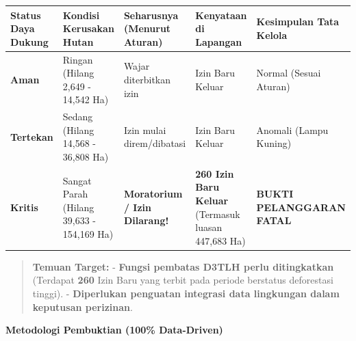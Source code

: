 \documentclass[
]{article}
\newcounter{none} %
\begin{document}
{\def\LTcaptype{none} %
\begin{longtable}[]{@{}
  >{\raggedright\arraybackslash}p{}
  >{\raggedright\arraybackslash}p{}
  >{\raggedright\arraybackslash}p{}
  >{\raggedright\arraybackslash}p{}
  >{\raggedright\arraybackslash}p{}@{}}
\toprule\noalign{}
\begin{minipage}[b]{\linewidth}\raggedright
Status Daya Dukung
\end{minipage} & \begin{minipage}[b]{\linewidth}\raggedright
Kondisi Kerusakan Hutan
\end{minipage} & \begin{minipage}[b]{\linewidth}\raggedright
Seharusnya (Menurut Aturan)
\end{minipage} & \begin{minipage}[b]{\linewidth}\raggedright
Kenyataan di Lapangan
\end{minipage} & \begin{minipage}[b]{\linewidth}\raggedright
Kesimpulan Tata Kelola
\end{minipage} \\
\midrule\noalign{}
\endhead
\bottomrule\noalign{}
\endlastfoot
\textbf{Aman} & Ringan (Hilang 2,649 - 14,542 Ha) & Wajar diterbitkan
izin & 39 Izin Baru Keluar & Normal (Sesuai Aturan) \\
\textbf{Tertekan} & Sedang (Hilang 14,568 - 36,808 Ha) & Izin mulai
direm/dibatasi & 81 Izin Baru Keluar & Anomali (Lampu Kuning) \\
\textbf{Kritis} & Sangat Parah (Hilang 39,633 - 154,169 Ha) &
\textbf{Moratorium / Izin Dilarang!} & \textbf{260 Izin Baru Keluar}
(Termasuk luasan 447,683 Ha) & \textbf{BUKTI PELANGGARAN FATAL} \\
\end{longtable}
}

\begin{quote}
\textbf{Temuan Target:} - \textbf{Fungsi pembatas D3TLH perlu
ditingkatkan} (Terdapat \textbf{260} Izin Baru yang terbit pada periode
berstatus deforestasi tinggi). - \textbf{Diperlukan penguatan integrasi
data lingkungan dalam keputusan perizinan}.
\end{quote}

\textbf{Metodologi Pembuktian (100\% Data-Driven)}
\end{document}
